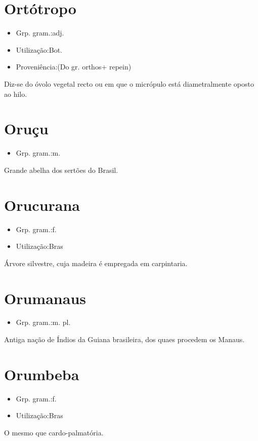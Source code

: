 \section{Ortótropo}
\begin{itemize}
\item {Grp. gram.:adj.}
\end{itemize}
\begin{itemize}
\item {Utilização:Bot.}
\end{itemize}
\begin{itemize}
\item {Proveniência:(Do gr. \textunderscore orthos\textunderscore  + \textunderscore repein\textunderscore )}
\end{itemize}
Diz-se do óvolo vegetal recto ou em que o micrópulo está diametralmente oposto ao hilo.
\section{Oruçu}
\begin{itemize}
\item {Grp. gram.:m.}
\end{itemize}
Grande abelha dos sertões do Brasil.
\section{Orucurana}
\begin{itemize}
\item {Grp. gram.:f.}
\end{itemize}
\begin{itemize}
\item {Utilização:Bras}
\end{itemize}
Árvore silvestre, cuja madeira é empregada em carpintaria.
\section{Orumanaus}
\begin{itemize}
\item {Grp. gram.:m. pl.}
\end{itemize}
Antiga nação de Índios da Guiana brasileira, dos quaes procedem os Manaus.
\section{Orumbeba}
\begin{itemize}
\item {Grp. gram.:f.}
\end{itemize}
\begin{itemize}
\item {Utilização:Bras}
\end{itemize}
O mesmo que \textunderscore cardo-palmatória\textunderscore .
